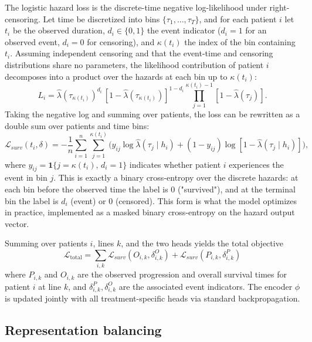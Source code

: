 \documentclass[a4paper,10pt]{article}
\begin{document}
The logistic hazard loss is the discrete-time negative log-likelihood under right-censoring. Let time be discretized into bins $\{\tau_1, \ldots, \tau_T\}$, and for each patient $i$ let $t_i$ be the observed duration, $d_i \in \{0, 1\}$ the event indicator ($d_i = 1$ for an observed event, $d_i = 0$ for censoring), and $\kappa(t_i)$ the index of the bin containing $t_i$. Assuming independent censoring and that the event-time and censoring distributions share no parameters, the likelihood contribution of patient $i$ decomposes into a product over the hazards at each bin up to $\kappa(t_i)$:
\begin{equation}
    L_i = \hat{\lambda}(\tau_{\kappa(t_i)})^{d_i} \, [1 - \hat{\lambda}(\tau_{\kappa(t_i)})]^{1 - d_i} \prod_{j=1}^{\kappa(t_i) - 1} [1 - \hat{\lambda}(\tau_j)].
\end{equation}
Taking the negative log and summing over patients, the loss can be rewritten as a double sum over patients and time bins:
\begin{equation}
    \mathcal{L}_{surv}(t_i, \delta) = -\frac{1}{n} \sum_{i=1}^{n} \sum_{j=1}^{\kappa(t_i)} \Big( y_{ij} \log \hat{\lambda}(\tau_j \mid h_i) + (1 - y_{ij}) \log [1 - \hat{\lambda}(\tau_j \mid h_i)] \Big),
    \label{eq:logistic-hazard-loss}
\end{equation}
where $y_{ij} = \mathbf{1}\{j = \kappa(t_i),\, d_i = 1\}$ indicates whether patient $i$ experiences the event in bin $j$. This is exactly a binary cross-entropy over the discrete hazards: at each bin before the observed time the label is $0$ ("survived"), and at the terminal bin the label is $d_i$ (event) or $0$ (censored). This form is what the model optimizes in practice, implemented as a masked binary cross-entropy on the hazard output vector.

Summing over patients $i$, lines $k$, and the two heads yields the total objective
\begin{equation}
    \mathcal{L}_{\text{total}} = \sum_{i, k} \mathcal{L}_{surv}(O_{i,k}, \delta^O_{i,k}) + \mathcal{L}_{surv}(P_{i,k}, \delta^P_{i,k})
\end{equation}
where $P_{i,k}$ and $O_{i,k}$ are the observed progression and overall survival times for patient $i$ at line $k$, and $\delta^P_{i,k}, \delta^O_{i,k}$ are the associated event indicators. The encoder $\phi$ is updated jointly with all treatment-specific heads via standard backpropagation.

\subsection{Representation balancing}
\end{document}
